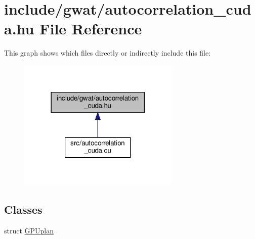 \hypertarget{autocorrelation__cuda_8hu}{}\section{include/gwat/autocorrelation\+\_\+cuda.hu File Reference}
\label{autocorrelation__cuda_8hu}
This graph shows which files directly or indirectly include this file\+:\nopagebreak
\begin{figure}[H]
\begin{center}
\leavevmode
\includegraphics[width=218pt]{autocorrelation__cuda_8hu__dep__incl}
\end{center}
\end{figure}
\subsection*{Classes}
\begin{DoxyCompactItemize}
\item 
struct \hyperlink{structGPUplan}{G\+P\+Uplan}
\end{DoxyCompactItemize}
